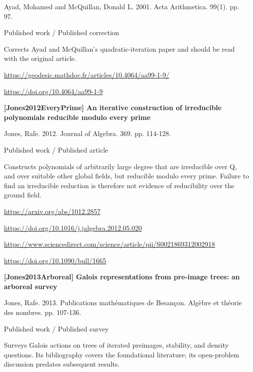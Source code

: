 \documentclass[11pt,a4paper,oneside,openany]{book}
\begin{document}
\color{black} Ayad, Mohamed and McQuillan, Donald L. 2001. Acta Arithmetica. 99(1). pp. 97.\par
{\small\sffamily\color{atlasgold}Published work / Published correction}\par
\color{black} Corrects Ayad and McQuillan's quadratic-iteration paper and should be read with the original article.\par
{\footnotesize\url{https://geodesic.mathdoc.fr/articles/10.4064/aa99-1-9/}}\par
{\footnotesize\url{https://doi.org/10.4064/aa99-1-9}}\par
\vspace{9pt}
\hypertarget{ref:Jones2012EveryPrime}{}
{\sffamily\bfseries\color{atlasgreen}[Jones2012EveryPrime] An iterative construction of irreducible polynomials reducible modulo every prime}\par
\color{black} Jones, Rafe. 2012. Journal of Algebra. 369. pp. 114-128.\par
{\small\sffamily\color{atlasgold}Published work / Published article}\par
\color{black} Constructs polynomials of arbitrarily large degree that are irreducible over Q, and over suitable other global fields, but reducible modulo every prime. Failure to find an irreducible reduction is therefore not evidence of reducibility over the ground field.\par
{\footnotesize\url{https://arxiv.org/abs/1012.2857}}\par
{\footnotesize\url{https://doi.org/10.1016/j.jalgebra.2012.05.020}}\par
{\footnotesize\url{https://www.sciencedirect.com/science/article/pii/S0021869312002918}}\par
{\footnotesize\url{https://doi.org/10.1090/bull/1665}}\par
\vspace{9pt}
\hypertarget{ref:Jones2013Arboreal}{}
{\sffamily\bfseries\color{atlasgreen}[Jones2013Arboreal] Galois representations from pre-image trees: an arboreal survey}\par
\color{black} Jones, Rafe. 2013. Publications mathématiques de Besançon. Algèbre et théorie des nombres. pp. 107-136.\par
{\small\sffamily\color{atlasgold}Published work / Published survey}\par
\color{black} Surveys Galois actions on trees of iterated preimages, stability, and density questions. Its bibliography covers the foundational literature; its open-problem discussion predates subsequent results.\par
\end{document}
